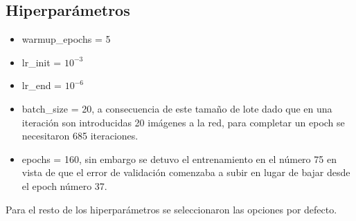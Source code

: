 \subsection{Hiperparámetros}
\begin{itemize}
    \item warmup\_epochs = 5
    \item lr\_init = $10^{-3}$
    \item lr\_end = $10^{-6}$
    \item batch\_size = 20, a consecuencia de este tamaño de lote dado que en una iteración son introducidas 20 imágenes a la red, para completar un epoch se necesitaron 685 iteraciones.
    \item epochs = 160, sin embargo se detuvo el entrenamiento en el número 75 en vista de que el error de validación comenzaba a subir en lugar de bajar desde el epoch número 37.
\end{itemize}
Para el resto de los hiperparámetros se seleccionaron las opciones por defecto. 
